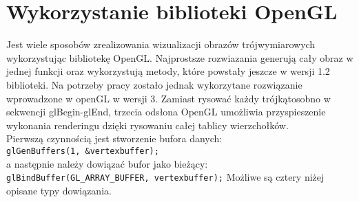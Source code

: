 \section{Wykorzystanie biblioteki OpenGL}
Jest wiele sposobów zrealizowania wizualizacji obrazów trójwymiarowych wykorzystując bibliotekę OpenGL. Najprostsze rozwiazania generują cały obraz w jednej funkcji oraz wykorzystują metody, które powstały jeszcze w wersji 1.2 biblioteki. Na potrzeby pracy zostało jednak wykorzytane rozwiązanie wprowadzone w openGL w wersji 3. Zamiast rysować każdy trójkątosobno w sekwencji glBegin-glEnd, trzecia odsłona OpenGL umożliwia przyspieszenie wykonania renderingu dzięki rysowaniu całej tablicy wierzchołków.\\
Pierwszą czynnością jest stworzenie bufora danych:\\
\verb$glGenBuffers(1, &vertexbuffer);$\\
a następnie należy dowiązać bufor jako bieżący:\\
\verb$glBindBuffer(GL_ARRAY_BUFFER, vertexbuffer);$
\newline\newline\newline\newline
Możliwe są cztery niżej opisane typy dowiązania.
